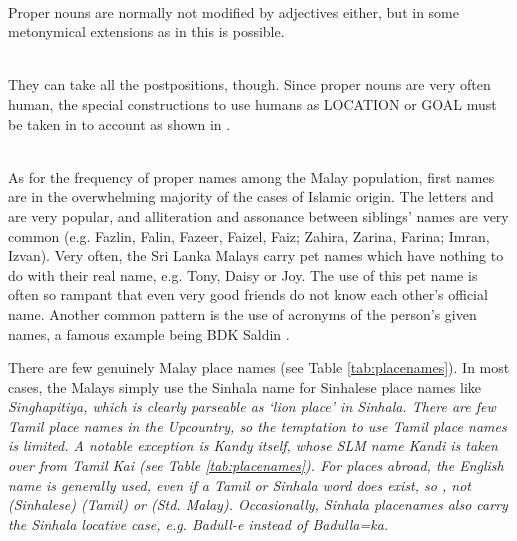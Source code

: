  \\
Proper nouns are normally not modified by adjectives either, but in some metonymical extensions as in  this is possible.


 \\

They can take all the postpositions, though. Since proper nouns are very often human, the special constructions to use humans as LOCATION or GOAL must be taken in to account as shown in .


 \\
As for the frequency of proper names among the Malay population, first names are in the overwhelming majority of the cases of Islamic origin. The letters  and  are very popular, and alliteration and assonance between siblings' names are very common (e.g. Fazlin, Falin, Fazeer, Faizel, Faiz; Zahira, Zarina, Farina; Imran, Izvan). Very often, the Sri Lanka Malays carry pet names which have nothing to do with their real name, e.g. Tony, Daisy or Joy. The use of this pet name is often so rampant that even very good friends do not know each other's official name. Another common pattern is the use of acronyms of the person's given names, a famous example being BDK Saldin .

There are few genuinely Malay place names (see Table \ref{tab:placenames}). In most cases, the Malays simply use the Sinhala name for Sinhalese place names like \em Singhapitiya\em, which is clearly parseable as `lion place' in Sinhala. There are few Tamil place names in the Upcountry, so the temptation to use Tamil place names is limited. A notable exception is Kandy itself, whose SLM name \em Kandi \em is taken over from Tamil \em Ka\nz\dz i \em (see Table \ref{tab:placenames}). For places abroad, the English name is generally used, even if a Tamil or Sinhala word does exist, so , not (Sinhalese) (Tamil) or (Std. Malay). Occasionally, Sinhala placenames also carry the Sinhala locative case, e.g. \em Badull-e \em instead of \em Badulla=ka\em.

